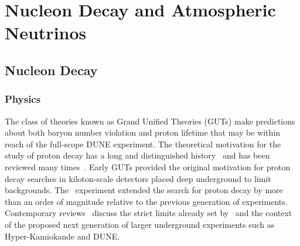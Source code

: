 \chapter{Nucleon Decay and Atmospheric Neutrinos}
\label{ch:physics-atmpdk}

\section{Nucleon Decay}
\label{sec:physics-atmpdk-ndk}

\subsection{Physics}
	The class of theories known as Grand Unified Theories (GUTs) make
predictions about both baryon number violation and  proton lifetime that may be
within reach of the full-scope DUNE experiment. 
%
The theoretical motivation for the study of proton decay has a long and
distinguished history~\cite{Pati:1973rp,Georgi:1974sy,Dimopoulos:1981dw} and
has been reviewed many times~\cite{Langacker:1980js,deBoer:1994dg,Nath:2006ut}.
%
Early GUTs provided the original motivation for proton decay searches in
kiloton-scale detectors placed deep underground to limit backgrounds.  The
 \superk\ experiment extended the search for proton decay by more
than an order of magnitude relative to the previous generation of experiments.
%
Contemporary reviews~\cite{Raby:2008pd,Senjanovic:2009kr,Li:2010dp} discuss the
strict limits already set by \superk\ and the context of the proposed next
generation of larger underground
experiments such as Hyper-Kamiokande and DUNE.


